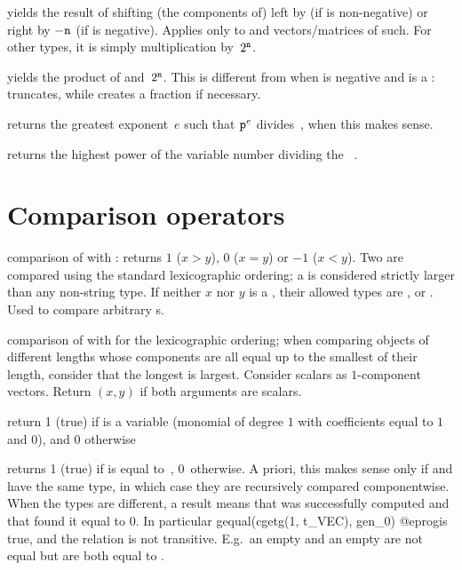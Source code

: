  yields the result of shifting
(the components of)  left by  (if  is non-negative)
or right by $-{\tt n}$ (if  is negative). Applies only to 
and vectors/matrices of such. For other types, it is simply multiplication
by~$2^{{\tt n}}$.

 yields the product of 
and~$2^{{\tt n}}$. This is different from  when  is negative
and  is a :  truncates, while 
creates a fraction if necessary.

 returns the greatest exponent~$e$ such that
${\tt p}^e$ divides~, when this makes sense.

 returns the highest power of the variable
number  dividing the ~.

\section{Comparison operators}


 comparison of  with : returns
$1$ ($x > y$), $0$ ($x = y$) or $-1$ ($x < y$). Two 
are compared using the standard lexicographic ordering; a 
is considered strictly larger than any non-string type. If neither
$x$ nor $y$ is a , their allowed types are , 
or . Used  to compare arbitrary s.

 comparison of  with  for the
lexicographic ordering; when comparing objects of different lengths whose
components are all equal up to the smallest of their length, consider that
the longest is largest. Consider scalars as $1$-component vectors. Return
$(x,y)$ if both arguments are scalars.

 return 1 (true) if  is a variable
(monomial of degree $1$ with  coefficients equal to $1$ and $0$),
and $0$ otherwise

 returns 1 (true) if  is equal
to~, 0~otherwise. A priori, this makes sense only if  and
 have the same type, in which case they are recursively compared
componentwise. When the types are different, a  result
means that  was successfully computed and that
 found it equal to $0$. In particular
\bprog
  gequal(cgetg(1, t_VEC), gen_0)
@eprog\noindent is true, and the relation is not transitive. E.g.~an empty
 and an empty  are not equal but are both equal to
.

